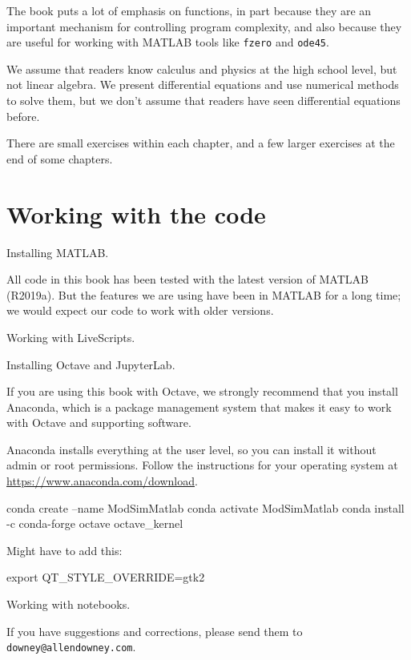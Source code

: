 \documentclass[
]{book}
\numberwithin{Answer}{chapter}
\numberwithin{Exercise}{chapter}
\begin{document}
The book puts a lot of emphasis on functions, in part because they are
an important mechanism for controlling program complexity, and also
because they are useful for working with MATLAB tools like {\tt fzero}
and {\tt ode45}.

We assume that readers know calculus and physics at the high school level, but not linear algebra.
We present differential equations and use numerical methods to solve them, but we don't assume that readers have seen differential equations before.

There are small exercises within each chapter, and a few larger
exercises at the end of some chapters.

\section*{Working with the code}

Installing MATLAB.

All code in this book has been tested with the latest version of MATLAB (R2019a).  But the features we are using have been in MATLAB for a long time; we would expect our code to work with older versions.


Working with LiveScripts.

Installing Octave and JupyterLab.

If you are using this book with Octave, we strongly recommend that you install Anaconda, which is a package management system that makes it easy to work with Octave and supporting software.

Anaconda installs everything at the user level, so you can install it without admin or root permissions.  Follow the instructions for your operating system at \url{https://www.anaconda.com/download}.

\begin{code}
conda create --name ModSimMatlab
conda activate ModSimMatlab
conda install -c conda-forge octave octave_kernel
\end{code}

Might have to add this:

\begin{code}
export QT_STYLE_OVERRIDE=gtk2
\end{code}


Working with notebooks.


If you have suggestions and corrections, please send them to
{\tt downey@allendowney.com}.

\end{document}
